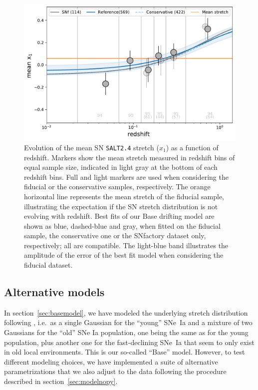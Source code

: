 \documentclass[]{aa} %
\begin{document}
\begin{figure}
    \centering
    \includegraphics[width=0.7\linewidth]{Article_figures/stretchevol_all_vs_snf.pdf}
    \caption{Evolution of the mean SN \textsc{\texttt{SALT2.4}} stretch ($x_1$)
        as a function of redshift. Markers show the mean stretch measured in
        redshift bins of equal sample size, indicated in light gray at the
        bottom of each redshift bins. Full and light markers are used when
        considering the fiducial or the conservative samples, respectively. The
        orange horizontal line represents the mean stretch of the fiducial
        sample, illustrating the expectation if the SN stretch distribution is
        not evolving with redshift. Best fits of our Base drifting model are
        shown as blue, dashed-blue and gray, when fitted on the fiducial sample,
        the conservative one or the SNfactory dataset only, respectively; all
        are compatible. The light-blue band illustrates the amplitude of the
    error of the best fit model when considering the fiducial dataset.}
    \label{fig:modelall}
\end{figure}

\subsection{Alternative models}\label{sec:othermodel}

In section~\ref{sec:basemodel}, we have modeled the underlying stretch
distribution following \cite{rigault2018}, i.e.\ as a single Gaussian for the
``young'' SNe~Ia and a mixture of two Gaussians for the ``old'' SNe Ia
population, one being the same as for the young population, plus another one for
the fast-declining SNe~Ia that seem to only exist in old local environments.
This is our so-called ``Base'' model. However, to test different modeling
choices, we have implemented a suite of alternative parametrizations that we
also adjust to the data following the procedure described in
section~\ref{sec:modelnopy}. 
\end{document}
